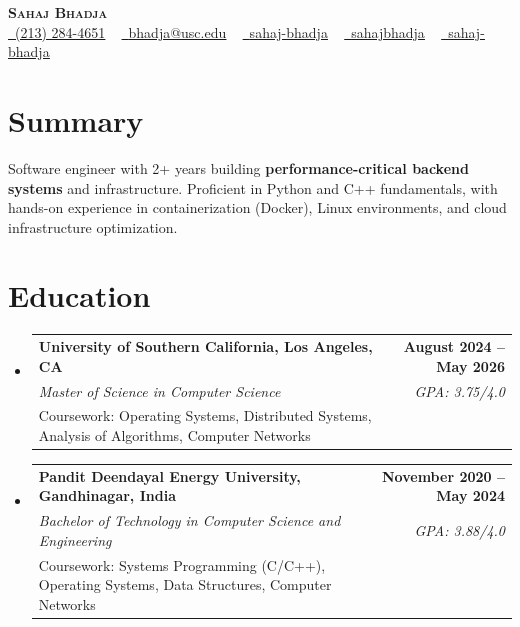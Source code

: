 \documentclass[letterpaper,10pt]{article}
\makeatletter
\newcommand{\resumeEduSubheading}[5]{\vspace{-1pt}\item\begin{tabular*}{1.0\textwidth}[t]{l@{\extracolsep{\fill}}r}\textbf{#1} & \textbf{\small #2} \\\textit{\small #3} & \textit{\small #4} \\\small #5 & \\\end{tabular*}\vspace{-4pt}}
\newcommand{\resumeSubHeadingListStart}{\begin{itemize}[leftmargin=0.0in, label={}]}
\newcommand{\resumeSubHeadingListEnd}{\end{itemize}}
\makeatother
\begin{document}
\begin{center}
{\Huge \scshape \textbf{Sahaj Bhadja}} \\ \vspace{1pt}
\small \href{tel:(213) 284-4651}{\faPhone\ \underline{(213) 284-4651}} ~ \href{mailto:bhadja@usc.edu}{\raisebox{-0.2\height}\faEnvelope\ \underline{bhadja@usc.edu}} ~
\href{https://www.linkedin.com/in/sahaj-bhadja/}{\raisebox{-0.2\height}\faLinkedin\ \underline{sahaj-bhadja}} ~ \href{https://github.com/SAHAJ-BHADJA}{\raisebox{-0.2\height}\faGithub\ \underline{sahajbhadja}} ~
\href{https://sahaj-bhadja.vercel.app/}{\raisebox{-0.2\height}\faGlobe\ \underline{sahaj-bhadja}}
\end{center}
\vspace{-18pt}
\section{Summary}
\begin{itemize}[leftmargin=0.15in, label={}]
\small{\item{Software engineer with 2+ years building \textbf{performance-critical backend systems} and infrastructure. Proficient in Python and C++ fundamentals, with hands-on experience in containerization (Docker), Linux environments, and cloud infrastructure optimization.}}
\end{itemize}
\vspace{-16pt}
\section{Education}
\resumeSubHeadingListStart
\resumeEduSubheading{University of Southern California, Los Angeles, CA}{August 2024 -- May 2026}{Master of Science in Computer Science}{GPA: 3.75/4.0}{Coursework: Operating Systems, Distributed Systems, Analysis of Algorithms, Computer Networks}
\vspace{-9pt}
\resumeEduSubheading{Pandit Deendayal Energy University, Gandhinagar, India}{November 2020 -- May 2024}{Bachelor of Technology in Computer Science and Engineering}{GPA: 3.88/4.0}{Coursework: Systems Programming (C/C++), Operating Systems, Data Structures, Computer Networks}
\resumeSubHeadingListEnd
\vspace{-14pt}
\end{document}
